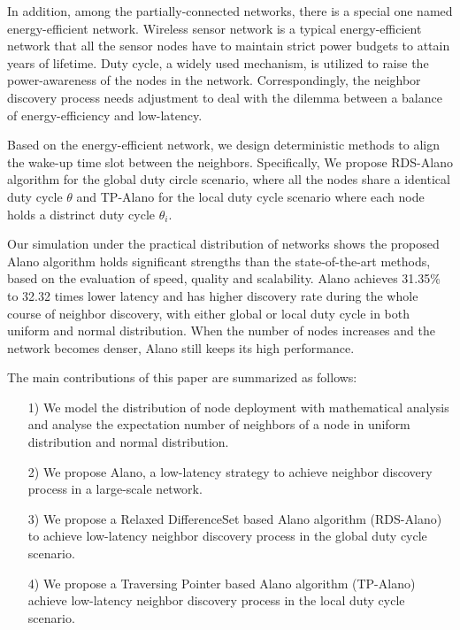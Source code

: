  
 
In addition, among the partially-connected networks, there is a special 
one named energy-efficient network.
Wireless sensor network is a typical energy-efficient network that all the sensor nodes have to maintain 
strict power budgets to attain years of lifetime\cite{dunkels2011contikimac}.
Duty cycle, a widely used mechanism, is utilized to raise the power-awareness of the nodes in the network.
Correspondingly, the neighbor discovery process needs adjustment to deal with the dilemma between 
a balance of energy-efficiency and low-latency.

Based on the energy-efficient network, we design deterministic methods to align the wake-up time slot between the neighbors.
Specifically, We propose RDS-Alano algorithm for the global duty circle scenario, where 
all the nodes share a identical duty cycle $\theta$ and TP-Alano for the
local duty cycle scenario where each node holds a distrinct duty cycle $\theta_i$. 


Our simulation under the practical distribution of networks 
\cite{wang2013gaussian} shows the proposed Alano algorithm
holds significant strengths than the state-of-the-art methods,
based on the evaluation of speed, quality and scalability.
Alano achieves 31.35\% to 32.32 times lower latency
and has higher discovery rate during the whole course of neighbor discovery, 
with either global or local duty cycle in both uniform and normal distribution.
When the number of nodes increases and the network becomes denser, 
Alano still keeps its high performance. 


The main contributions of this paper are summarized as follows:
\begin{itemize}
\item[1)] We model the distribution of node deployment with mathematical analysis 
and analyse the expectation number of neighbors of a node in uniform distribution and normal
distribution.
\item[2)] We propose Alano, a low-latency strategy to achieve neighbor discovery process
in a large-scale network.
\item[3)] We propose a Relaxed DifferenceSet based Alano algorithm (RDS-Alano) 
to achieve low-latency neighbor discovery process in the global duty cycle scenario. 
\item[4)] We propose a Traversing Pointer based Alano algorithm (TP-Alano) 
achieve low-latency neighbor discovery process in the local duty cycle scenario. 
\end{itemize}



